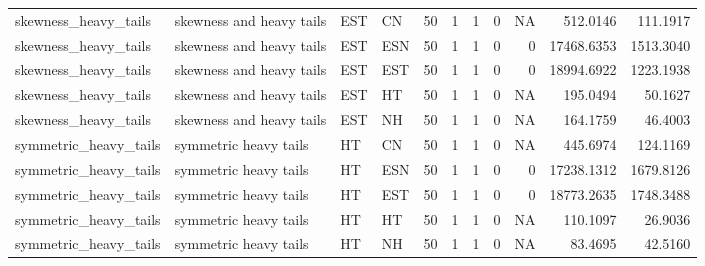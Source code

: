 \begin{table}[!h]
{\begin{tabular}[t]{llllrrrrrrr}
\addlinespace
skewness_heavy_tails & skewness and heavy tails & EST & CN & 50 & 1 & 1 & 0 & NA & 512.0146 & 111.1917\\
skewness_heavy_tails & skewness and heavy tails & EST & ESN & 50 & 1 & 1 & 0 & 0 & 17468.6353 & 1513.3040\\
skewness_heavy_tails & skewness and heavy tails & EST & EST & 50 & 1 & 1 & 0 & 0 & 18994.6922 & 1223.1938\\
skewness_heavy_tails & skewness and heavy tails & EST & HT & 50 & 1 & 1 & 0 & NA & 195.0494 & 50.1627\\
skewness_heavy_tails & skewness and heavy tails & EST & NH & 50 & 1 & 1 & 0 & NA & 164.1759 & 46.4003\\
\addlinespace
symmetric_heavy_tails & symmetric heavy tails & HT & CN & 50 & 1 & 1 & 0 & NA & 445.6974 & 124.1169\\
symmetric_heavy_tails & symmetric heavy tails & HT & ESN & 50 & 1 & 1 & 0 & 0 & 17238.1312 & 1679.8126\\
symmetric_heavy_tails & symmetric heavy tails & HT & EST & 50 & 1 & 1 & 0 & 0 & 18773.2635 & 1748.3488\\
symmetric_heavy_tails & symmetric heavy tails & HT & HT & 50 & 1 & 1 & 0 & NA & 110.1097 & 26.9036\\
symmetric_heavy_tails & symmetric heavy tails & HT & NH & 50 & 1 & 1 & 0 & NA & 83.4695 & 42.5160\\
\bottomrule
\end{tabular}}
\end{table}
